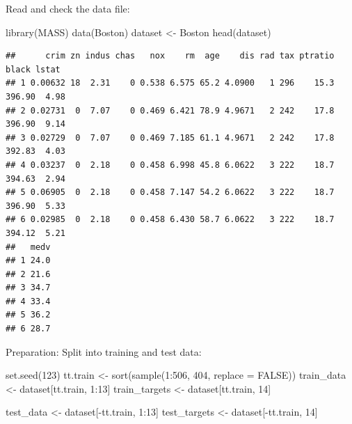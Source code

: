 \documentclass[
  10pt,
  ignorenonframetext,
]{beamer}
\newenvironment{Shaded}{\begin{snugshade}}{\end{snugshade}}
\newcommand{\AttributeTok}[1]{\textcolor[rgb]{0.77,0.63,0.00}{#1}}
\newcommand{\ConstantTok}[1]{\textcolor[rgb]{0.00,0.00,0.00}{#1}}
\newcommand{\DecValTok}[1]{\textcolor[rgb]{0.00,0.00,0.81}{#1}}
\newcommand{\FunctionTok}[1]{\textcolor[rgb]{0.00,0.00,0.00}{#1}}
\newcommand{\NormalTok}[1]{#1}
\newcommand{\OtherTok}[1]{\textcolor[rgb]{0.56,0.35,0.01}{#1}}
\newcommand{\SpecialCharTok}[1]{\textcolor[rgb]{0.00,0.00,0.00}{#1}}
\begin{document}
\begin{frame}[fragile]
Read and check the data file:

\scriptsize

\begin{Shaded}
\begin{Highlighting}[]
\FunctionTok{library}\NormalTok{(MASS)}
\FunctionTok{data}\NormalTok{(Boston)}
\NormalTok{dataset }\OtherTok{\textless{}{-}}\NormalTok{ Boston}
\FunctionTok{head}\NormalTok{(dataset)}
\end{Highlighting}
\end{Shaded}

\begin{verbatim}
##      crim zn indus chas   nox    rm  age    dis rad tax ptratio  black lstat
## 1 0.00632 18  2.31    0 0.538 6.575 65.2 4.0900   1 296    15.3 396.90  4.98
## 2 0.02731  0  7.07    0 0.469 6.421 78.9 4.9671   2 242    17.8 396.90  9.14
## 3 0.02729  0  7.07    0 0.469 7.185 61.1 4.9671   2 242    17.8 392.83  4.03
## 4 0.03237  0  2.18    0 0.458 6.998 45.8 6.0622   3 222    18.7 394.63  2.94
## 5 0.06905  0  2.18    0 0.458 7.147 54.2 6.0622   3 222    18.7 396.90  5.33
## 6 0.02985  0  2.18    0 0.458 6.430 58.7 6.0622   3 222    18.7 394.12  5.21
##   medv
## 1 24.0
## 2 21.6
## 3 34.7
## 4 33.4
## 5 36.2
## 6 28.7
\end{verbatim}

\normalsize

Preparation: Split into training and test data:

\scriptsize

\begin{Shaded}
\begin{Highlighting}[]
\FunctionTok{set.seed}\NormalTok{(}\DecValTok{123}\NormalTok{)}
\NormalTok{tt.train }\OtherTok{\textless{}{-}} \FunctionTok{sort}\NormalTok{(}\FunctionTok{sample}\NormalTok{(}\DecValTok{1}\SpecialCharTok{:}\DecValTok{506}\NormalTok{, }\DecValTok{404}\NormalTok{, }\AttributeTok{replace =} \ConstantTok{FALSE}\NormalTok{))}
\NormalTok{train\_data }\OtherTok{\textless{}{-}}\NormalTok{ dataset[tt.train, }\DecValTok{1}\SpecialCharTok{:}\DecValTok{13}\NormalTok{]}
\NormalTok{train\_targets }\OtherTok{\textless{}{-}}\NormalTok{ dataset[tt.train, }\DecValTok{14}\NormalTok{]}

\NormalTok{test\_data }\OtherTok{\textless{}{-}}\NormalTok{ dataset[}\SpecialCharTok{{-}}\NormalTok{tt.train, }\DecValTok{1}\SpecialCharTok{:}\DecValTok{13}\NormalTok{]}
\NormalTok{test\_targets }\OtherTok{\textless{}{-}}\NormalTok{ dataset[}\SpecialCharTok{{-}}\NormalTok{tt.train, }\DecValTok{14}\NormalTok{]}
\end{Highlighting}
\end{Shaded}
\end{frame}
\end{document}
